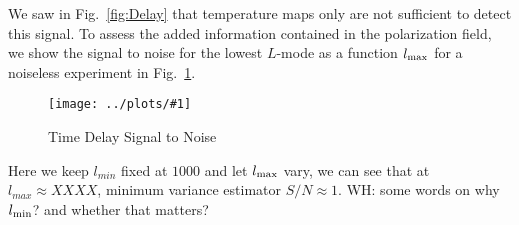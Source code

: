 \documentclass[prl,amsmath,amssymb,floatfix,superscriptaddress,nofootinbib,twocolumn]{revtex4-1}
\newcommand{\sfig}[2]{
\texttt{[image: ../plots/\#1]}
        }
\newcommand{\Spng}[2]{
   \begin{figure}[thbp]
   \begin{center}
    \sfig{#1.png}{\columnwidth}
    \caption{{\small #2}}
    \label{fig:#1}
     \end{center}
   \end{figure}
}
\newcommand{\rf}[1]{\ref{fig:#1}}
\newcommand{\wh}[1]{{\color{red} WH: #1}}
\begin{document}
We saw in Fig.~\rf{Delay} that temperature maps only are not sufficient to detect this signal. To assess the added information contained in the polarization field, we show the signal to noise for the lowest $L$-mode as a function $l_{\rm max}$ for a noiseless experiment in Fig.~\rf{StoN}.
\Spng{StoN}{Time Delay Signal to Noise}
Here we keep $l_{min}$ fixed at $1000$ and let $l_{\rm max}$ vary, we can see that at $l_{max} \approx XXXX$, minimum variance estimator $S/N \approx 1$.  \wh{some words on why $l_{\rm min}$? and whether that matters?}

\appendix
\end{document}
